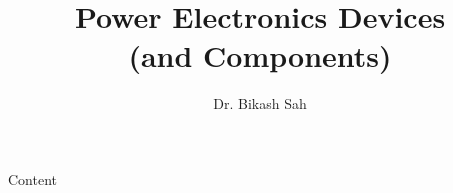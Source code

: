 \documentclass{../course_template/lectureClass}
\begin{document}

\title[Power Electronics Devices]{Power Electronics Devices \\ (and Components)}
\author{Dr. Bikash Sah}
\date{}
\begin{frame}[plain]
    \titlepage
\end{frame}

\begin{frame}{Content}
    \tableofcontents
\end{frame}


%

\end{document}
